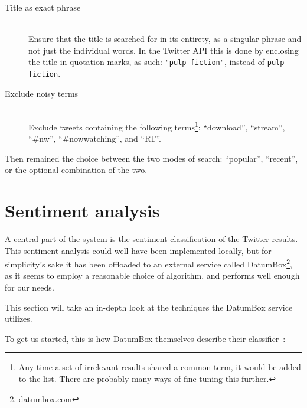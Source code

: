 \begin{description}
  \item[Title as exact phrase] \hfill \\
    Ensure that the title is searched for in its entirety, as a singular phrase and not just the individual words. In the Twitter API this is done by enclosing the title in quotation marks, as such: \verb+"pulp fiction"+, instead of \verb+pulp fiction+.
  \item[Exclude noisy terms] \hfill \\
  Exclude tweets containing the following terms\footnote{Any time a set of irrelevant results shared a common term, it would be added to the list. There are probably many ways of fine-tuning this further.}: ``download'', ``stream'', ``\#nw'', ``\#nowwatching'', and ``RT''.
\end{description}

Then remained the choice between the two modes of search: ``popular'', ``recent'', or the optional combination of the two.



\section{Sentiment analysis} %
\label{sec:sentiment_analysis_impl}

A central part of the system is the sentiment classification of the Twitter results. This sentiment analysis could well have been implemented locally, but for simplicity's sake it has been offloaded to an external service called DatumBox\footnote{\url{datumbox.com}}, as it seems to employ a reasonable choice of algorithm, and performs well enough for our needs.

This section will take an in-depth look at the techniques the DatumBox service utilizes.


To get us started, this is how DatumBox themselves describe their classifier~\cite{DatumBoxTwitterSentiment}:

